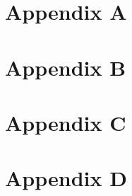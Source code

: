\documentclass{Trade_template}
\numberwithin{equation}{section}
\begin{document}
\newpage

\chapter*{Appendix A} \label{Appendix A}



\chapter*{Appendix B} \label{Appendix B}



\newpage

\chapter*{Appendix C} \label{Appendix C}



\newpage

\chapter*{Appendix D} \label{Appendix D}


\end{document}
